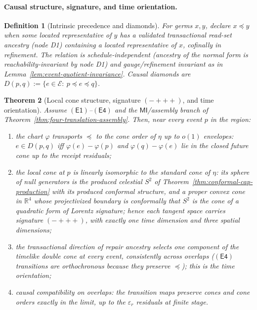 \documentclass[11pt]{article}
\newtheorem{theorem}{Theorem}[section]
\newtheorem{definition}[theorem]{Definition}
\begin{document}
\paragraph{Causal structure, signature, and time orientation.}

\begin{definition}[Intrinsic precedence and diamonds]
\label{def:intrinsic-precedence}
For germs \(x,y\), declare \(x\preceq y\) when some located representative of
\(y\) has a validated transactional read-set ancestry (node D1) containing a
located representative of \(x\), cofinally in refinement. The relation is
schedule-independent (ancestry of the normal form is
reachability-invariant by node D1) and gauge/refinement invariant as in
Lemma~\ref{lem:event-quotient-invariance}. Causal diamonds are
\(D(p,q):=\{e\in\mathcal E:\ p\preceq e\preceq q\}\).
\end{definition}

\begin{theorem}[Local cone structure, signature \((-{+}{+}{+})\), and time orientation]
\label{thm:event-causal-structure}
Assume \(\mathsf{(E1)}\)--\(\mathsf{(E4)}\) and the
\(\mathsf{MI}\)/assembly branch of
Theorem~\ref{thm:four-translation-assembly}. Then, near every event \(p\) in
the region:
\begin{enumerate}[leftmargin=2em]
\item the chart \(\varphi\) transports \(\preceq\) to the cone order of
\(\eta\) up to \(o(1)\) envelopes: \(e\in D(p,q)\) iff
\(\varphi(e)-\varphi(p)\) and \(\varphi(q)-\varphi(e)\) lie in the closed
future cone up to the receipt residuals;
\item the local cone at \(p\) is linearly isomorphic to the standard cone of
\(\eta\): its sphere of null generators is the produced celestial \(S^2\) of
Theorem~\ref{thm:conformal-cap-production} with its produced conformal
structure, and a proper convex cone in \(\mathbb R^4\) whose projectivized
boundary is conformally that \(S^2\) is the cone of a quadratic form of
Lorentz signature; hence each tangent space carries signature
\((-{+}{+}{+})\), with exactly one time dimension and three spatial
dimensions;
\item the transactional direction of repair ancestry selects one component of
the timelike double cone at every event, consistently across overlaps
(\(\mathsf{(E4)}\) transitions are orthochronous because they preserve
\(\preceq\)); this is the time orientation;
\item causal compatibility on overlaps: the transition maps preserve cones
and cone orders exactly in the limit, up to the \(\varepsilon_r\) residuals at
finite stage.
\end{enumerate}
\end{theorem}
\end{document}
